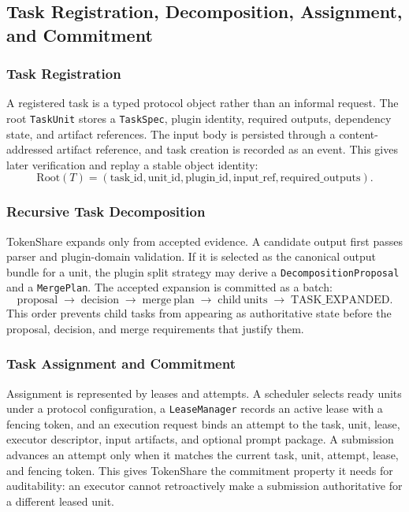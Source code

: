 \documentclass{article}
\theoremstyle{plain}
\begin{document}
\subsection{Task Registration, Decomposition, Assignment, and Commitment}

\subsubsection{Task Registration}

{\color{blue}
A registered task is a typed protocol object rather than an informal request. The root \texttt{TaskUnit} stores a \texttt{TaskSpec}, plugin identity, required outputs, dependency state, and artifact references. The input body is persisted through a content-addressed artifact reference, and task creation is recorded as an event. This gives later verification and replay a stable object identity:
\[
\mathrm{Root}(T)=
(\mathrm{task\_id},\mathrm{unit\_id},\mathrm{plugin\_id},\mathrm{input\_ref},\mathrm{required\_outputs}).
\]
}

\subsubsection{Recursive Task Decomposition}

{\color{blue}
TokenShare expands only from accepted evidence. A candidate output first passes parser and plugin-domain validation. If it is selected as the canonical output bundle for a unit, the plugin split strategy may derive a \texttt{DecompositionProposal} and a \texttt{MergePlan}. The accepted expansion is committed as a batch:
\[
\mathrm{proposal}\; \rightarrow\; \mathrm{decision}\; \rightarrow\; \mathrm{merge\ plan}\; \rightarrow\; \mathrm{child\ units}\; \rightarrow\; \mathrm{TASK\_EXPANDED}.
\]
This order prevents child tasks from appearing as authoritative state before the proposal, decision, and merge requirements that justify them.
}

\subsubsection{Task Assignment and Commitment}

{\color{blue}
Assignment is represented by leases and attempts. A scheduler selects ready units under a protocol configuration, a \texttt{LeaseManager} records an active lease with a fencing token, and an execution request binds an attempt to the task, unit, lease, executor descriptor, input artifacts, and optional prompt package. A submission advances an attempt only when it matches the current task, unit, attempt, lease, and fencing token. This gives TokenShare the commitment property it needs for auditability: an executor cannot retroactively make a submission authoritative for a different leased unit.
}
\end{document}
